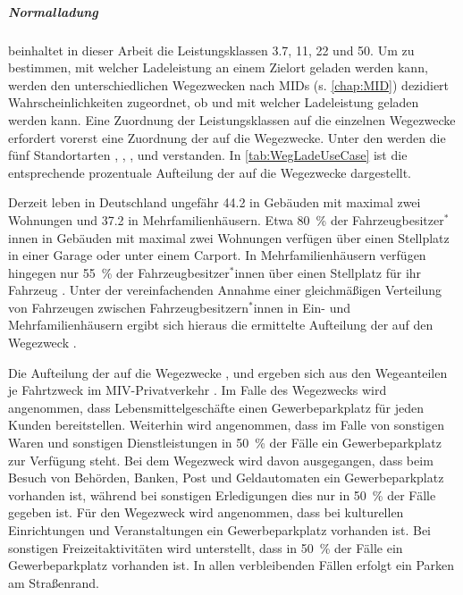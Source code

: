 \subparagraph{Normalladung} beinhaltet in dieser Arbeit die Leistungsklassen \SI{3.7}{\kw}, \SI{11}{\kw}, \SI{22}{\kw} und \SI{50}{\kw}.
Um zu bestimmen, mit welcher Ladeleistung an einem Zielort geladen werden kann, werden den unterschiedlichen Wegezwecken nach \glspl{MID} (s. \autoref{chap:MID}) dezidiert Wahrscheinlichkeiten zugeordnet, ob und mit welcher Ladeleistung geladen werden kann.
Eine Zuordnung der Leistungsklassen auf die einzelnen Wegezwecke erfordert vorerst eine Zuordnung der \UCs auf die Wegezwecke.
Unter den \UCs werden die fünf Standortarten \Eigenheimdot, \Wohnanlagedot, \Firmeparkplatzdot, \Gewerbeparkplatz und \Straszenrand verstanden.
In \autoref{tab:WegLadeUseCase} ist die entsprechende prozentuale Aufteilung der \UCs auf die Wegezwecke dargestellt.



Derzeit leben in Deutschland ungefähr \SI{44.2}{\MioMen} in Gebäuden mit maximal zwei Wohnungen und \SI{37.2}{\MioMen} in Mehrfamilienhäusern.
Etwa \SI{80}{\percent} der \linebreak Fahrzeugbesitzer$^*$innen in Gebäuden mit maximal zwei Wohnungen verfügen über einen Stellplatz in einer Garage oder unter einem Carport.
In Mehrfamilienhäusern verfügen hingegen nur \SI{55}{\percent} der Fahrzeugbesitzer$^*$innen über einen Stellplatz für ihr Fahrzeug \cite{dena2020}.
Unter der vereinfachenden Annahme einer gleichmäßigen Verteilung von Fahrzeugen zwischen Fahrzeugbesitzern$^*$innen in Ein- und Mehrfamilienhäusern ergibt sich hieraus die ermittelte Aufteilung der \UCs auf den Wegezweck \nHdot.\medskip

Die Aufteilung der \UCs auf die Wegezwecke \Einkaufdot, \Erledigung und \Freizeit ergeben sich aus den Wegeanteilen je Fahrtzweck im \gls{MIV}-Privatverkehr \cite{Rikus2015}.
Im Falle des Wegezwecks \Einkauf wird angenommen, dass Lebensmittelgeschäfte einen Gewerbeparkplatz für jeden Kunden bereitstellen.
Weiterhin wird angenommen, dass im Falle von sonstigen Waren und sonstigen Dienstleistungen in \SI{50}{\percent} der Fälle ein Gewerbeparkplatz zur Verfügung steht.
Bei dem Wegezweck \Erledigung wird davon ausgegangen, dass beim Besuch von Behörden, Banken, Post und Geldautomaten ein Gewerbeparkplatz vorhanden ist, während bei sonstigen Erledigungen dies nur in \SI{50}{\percent} der Fälle gegeben ist.
Für den Wegezweck \Freizeit wird angenommen, dass bei kulturellen Einrichtungen und Veranstaltungen ein Gewerbeparkplatz vorhanden ist.
Bei sonstigen Freizeitaktivitäten wird unterstellt, dass in \SI{50}{\percent} der Fälle ein Gewerbeparkplatz vorhanden ist.
In allen verbleibenden Fällen erfolgt ein Parken am Straßenrand.\medskip

